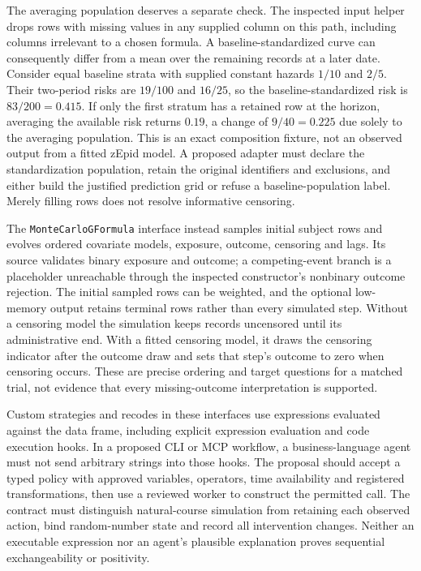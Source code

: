 The averaging population deserves a separate check. The inspected input
helper drops rows with missing values in any supplied column on this path,
including columns irrelevant to a chosen formula. A baseline-standardized
curve can consequently differ from a mean over the remaining records at a
later date. Consider equal baseline strata with supplied constant hazards
$1/10$ and $2/5$. Their two-period risks are $19/100$ and $16/25$, so the
baseline-standardized risk is $83/200=0.415$. If only the first stratum has
a retained row at the horizon, averaging the available risk returns $0.19$,
a change of $9/40=0.225$ due solely to the averaging population. This is an
exact composition fixture, not an observed output from a fitted zEpid model.
A proposed adapter must declare the standardization population, retain the
original identifiers and exclusions, and either build the justified prediction
grid or refuse a baseline-population label. Merely filling rows does not
resolve informative censoring.~\citep{exec24_longpy_zepid_source,exec24_longpy_reference}

The \texttt{MonteCarloGFormula} interface instead samples initial subject rows
and evolves ordered covariate models, exposure, outcome, censoring and lags.
Its source validates binary exposure and outcome; a competing-event branch
is a placeholder unreachable through the inspected constructor's nonbinary
outcome rejection. The initial sampled rows can be weighted, and the optional
low-memory output retains terminal rows rather than every simulated step.
Without a censoring model the simulation keeps records uncensored until its
administrative end. With a fitted censoring model, it draws the censoring
indicator after the outcome draw and sets that step's outcome to zero when
censoring occurs. These are precise ordering and target questions for a
matched trial, not evidence that every missing-outcome interpretation is
supported.~\citep{exec24_longpy_zepid_source}

Custom strategies and recodes in these interfaces use expressions evaluated
against the data frame, including explicit expression evaluation and code
execution hooks. In a proposed CLI or MCP workflow, a business-language agent
must not send arbitrary strings into those hooks. The proposal should accept
a typed policy with approved variables, operators, time availability and
registered transformations, then use a reviewed worker to construct the
permitted call. The contract must distinguish natural-course simulation from
retaining each observed action, bind random-number state and record all
intervention changes. Neither an executable expression nor an agent's
plausible explanation proves sequential exchangeability or positivity.
\citep{exec24_longpy_zepid_source}

